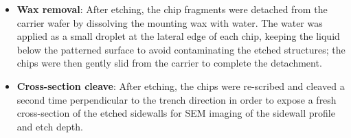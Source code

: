 \begin{itemize}
  \item \textbf{Wax removal}: After etching, the chip fragments were
    detached from the carrier wafer by dissolving the mounting wax with
    water. The water was applied as a small droplet at the lateral edge of
    each chip, keeping the liquid below the patterned surface to avoid
    contaminating the etched structures; the chips were then gently slid
    from the carrier to complete the detachment.

  \item \textbf{Cross-section cleave}: After etching, the chips were
    re-scribed and cleaved a second time perpendicular to the trench direction
    in order to expose a fresh cross-section of the etched sidewalls for SEM
    imaging of the sidewall profile and etch depth.

\end{itemize}
